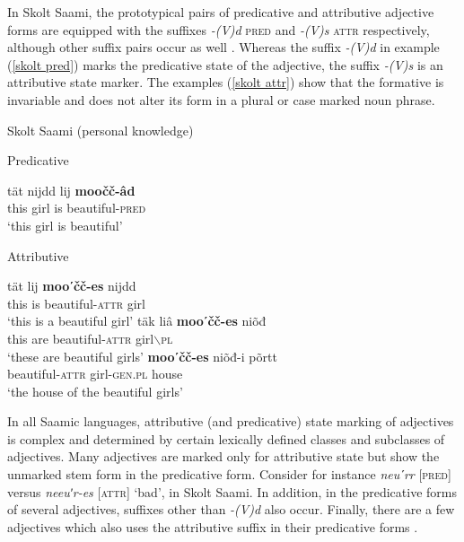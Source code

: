 In Skolt Saami, the prototypical pairs of predicative and attributive adjective forms are equipped with the suffixes \textit{-(V)d} \textsc{pred} and \textit{-(V)s} \textsc{attr} respectively, although other suffix pairs occur as well \citep[173–176]{feist2015a}. Whereas the suffix \textit{-(V)d} in example (\ref{skolt pred}) marks the predicative state of the adjective, the suffix \mbox{\textit{-(V)s}} is an attributive state marker. The examples (\ref{skolt attr}) show that the formative is invariable and does not alter its form in a plural or case marked noun phrase.
\begin{exe}
\ex \rm{Skolt Saami (personal knowledge)}
\begin{xlist}
\ex \label{skolt pred}
\rm{Predicative}
\begin{xlist}
\gll	tät nijdd lij \textbf{moočč-âd}\\
	this girl is beautiful-\textsc{pred}\\
\glt	‘this girl is beautiful’
\end{xlist}
\ex \label{skolt attr}
\rm{Attributive} 
\begin{xlist}
\ex
\gll 	tät lij \textbf{mooʹčč-es} nijdd\\
	this is beautiful-\textsc{attr} girl\\
\glt	‘this is a beautiful girl’
\ex	
\gll	täk liâ \textbf{mooʹčč-es} niõđ\\
	this are beautiful-\textsc{attr} girl$\backslash$\textsc{pl}\\
\glt	‘these are beautiful girls’
\ex	
\gll	\textbf{mooʹčč-es} niõđ-i põrtt\\
	beautiful-\textsc{attr} girl-\textsc{gen.pl} house\\
\glt	‘the house of the beautiful girls’
\end{xlist}
\end{xlist}
\end{exe}
In all Saamic languages, attributive (and predicative) state marking of adjectives is complex and determined by certain lexically defined classes and subclasses of adjectives. Many adjectives are marked only for attributive state but show the unmarked stem form in the predicative form. Consider for instance \textit{neuʹrr} [\textsc{pred}] versus \textit{neeuʹr-es} [\textsc{attr}] ‘bad’, in Skolt Saami. In addition, in the predicative forms of several adjectives, suffixes other than \textit{-(V)d} also occur. Finally, there are a few adjectives which also uses the attributive suffix in their predicative forms \citep[cf.][173–176]{feist2015a}.

